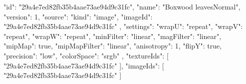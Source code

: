 {
  "id": "29a4e7ed82fb35b4aae73ae94d9c31fc",
  "name": "Boxwood leavesNormal",
  "version": 1,
  "source": {
    "kind": "image",
    "imageId": "29a4e7ed82fb35b4aae73ae94d9c31fc"
  },
  "settings": {
    "wrapU": "repeat",
    "wrapV": "repeat",
    "wrapW": "repeat",
    "minFilter": "linear",
    "magFilter": "linear",
    "mipMap": true,
    "mipMapFilter": "linear",
    "anisotropy": 1,
    "flipY": true,
    "precision": "low",
    "colorSpace": "srgb"
  },
  "textureIds": [
    "29a4e7ed82fb35b4aae73ae94d9c31fc"
  ],
  "imageIds": [
    "29a4e7ed82fb35b4aae73ae94d9c31fc"
  ]
}
